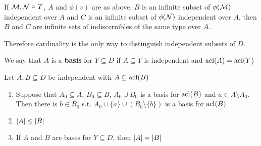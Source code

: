\documentclass[11pt]{article}
\begin{document}
\begin{corollary}[]
\label{cor6.1.7}
If \(\mathcal{M},\mathcal{N}\vDash T\), \(A\) and \(\phi(v)\) are as above, \(B\) is an infinite subset of \(\phi(\mathcal{M})\)
independent over \(A\) and \(C\) is an infinite subset of \(\phi(\mathcal{N})\) independent over \(A\),
then \(B\) and \(C\) are infinite sets of indiscernibles of the same type over \(A\).
\end{corollary}

Therefore cardinality is the only way to distinguish independent subsets of \(D\).

\begin{definition}[]
We say that \(A\) is a \textbf{basis} for \(Y\subseteq D\) if \(A\subseteq Y\) is independent and \(\operatorname{acl}(A)=\operatorname{acl}(Y)\)
\end{definition}

\begin{lemma}[]
\label{lemma6.1.9}
Let \(A,B\subseteq D\) be independent with \(A\subseteq\operatorname{acl}(B)\)
\begin{enumerate}
\item Suppose that \(A_0\subseteq A\), \(B_0\subseteq B\), \(A_0\cup B_0\) is a basis for \(\operatorname{acl}(B)\)
and \(a\in A\setminus A_0\). Then there is \(b\in B_0\) s.t. \(A_0\cup\{a\}\cup(B_0\setminus\{b\})\) is a basis for \(\operatorname{acl}(B)\)
\item \(\abs{A}\le\abs{B}\)
\item If \(A\) and \(B\) are bases for \(Y\subseteq D\), then \(\abs{A}=\abs{B}\)
\end{enumerate}
\end{lemma}

\end{document}
